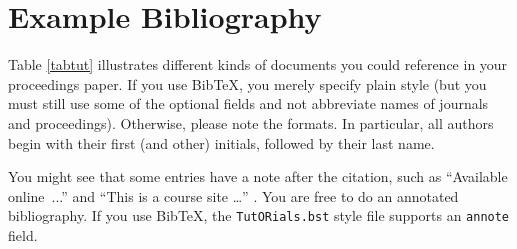 \documentclass{ics-2015}
\begin{document}
\section{Example Bibliography}

Table \ref{tabtut} illustrates different kinds of documents you could reference in your
proceedings paper.  If you use BibTeX, you merely specify plain style (but you must still use
some of the optional fields and not abbreviate names of journals and proceedings). Otherwise,
please note the formats.  In particular, all authors begin with their first (and other)
initials, followed by their last name.

You might see that some entries have a note after the citation, such as
``Available on\-line~...'' \cite{manualwithAuthor} and
``This is a course site \dots'' \cite{websitecourse}.  You are free to do an
annotated bibliography.  If you use BibTeX, the \verb+TutORials.bst+ style file
supports an \texttt{annote} field.
\end{document}
